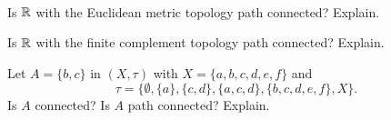 \begin{pa} ~
\be
\item Is $\mathbb{R}$ with the Euclidean metric topology path connected? Explain.

\item Is $\mathbb{R}$ with the finite complement topology path connected? Explain.

\item Let $A = \{b,c\}$ in $(X, \tau)$ with $X= \{a,b,c,d,e,f\}$ and 
\[\tau = \{\emptyset,\{a\}, \{c,d\}, \{a,c,d\}, \{b,c,d,e,f\}, X\}.\]
Is $A$ connected? Is $A$ path connected? Explain. 

\ee

\end{pa}

\begin{comment}

\ActivitySolution

\be
\item The answer is yes. Let $a, b \in \R$, and define $p:[0,1] \to \R$ by $p(x) = a+(b-a)x$. Since $p$ is a linear function, we have shown in previous work that $p$ is continuous. Note that $p(0) = a$ and $p(1) = b$. So $\R$ is path connected. 

\item  Let $a, b \in \R$. Define $p:[0,1] \to \R$ by $p(0) = a + (b-a)x$. Then $p(0) = a$ and $p(1) = b$. We consider the cases $a = b$ and $a \neq b$.

If $a = b$, then $p$ is the constant function $p(x) = a$. Let $O$ be an open set in $\R$. If $a \in O$, then $p^{-1}(O) = [0,1]$. If $a \notin O$, then $p^{-1}(O) = \emptyset$. In any case, $p^{-1}(O)$ is open and so $p$ is a continuous function.

Now assume $a \neq b$. Then $p$ is an injection. To demonstrate that $p$ is continuous, let $O$ be an open set in $\R$. So $\R \setminus O$ is finite. This implies that $p^{-1}(\R \setminus O)$ is finite. But $p^{-1}(\R \setminus O) = [0,1] \setminus p^{-1}(O)$. Any finite set is closed in $[0,1]$, so $p^{-1}(O)$ is open and $p$ is continuous. Therefore, $\R$ with the finite complement topology is path connected. 

\item  The only open sets that contain $b$ are $\{b,c,d,e,f\}$ and $X$. But these two sets do not form a separation of $A$, so $A$ is connected. 
It is also true that $A$ is path connected. The constant function $p: [0,1] \to A$ defined by $p(x)=b$ is a path from $b$ to $b$.  Similarly, there is a constant path from $c$ to $c$. So the only question is whether there is a path from $b$ to $c$. The open sets in $A$ are $\emptyset$, $\{c\}$, and $A$. Let $p: [0,1] \to A$ be defined by $p(0)=b$, and $p(x) = c$ for all $x \neq 0$. Since $p^{-1}(\emptyset) = \emptyset$, $p^{-1}(\{c\}) = (0,1]$ and $p^{-1}(A) = [0,1]$, all of which are open in $[0,1]$, we see that $p$ is a continuous function. Therefore, $A$ is also path connected. 

\ee

\end{comment}

